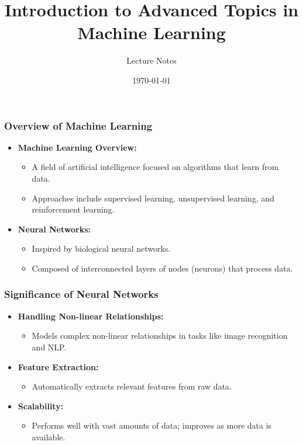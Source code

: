\documentclass[aspectratio=169]{beamer}
\begin{document}
\frame{\titlepage}

\begin{frame}[fragile]
    \title{Introduction to Advanced Topics in Machine Learning}
    \author{Lecture Notes}
    \date{\today}
    \maketitle
\end{frame}

\begin{frame}[fragile]
    \frametitle{Overview of Machine Learning}
    \begin{itemize}
        \item \textbf{Machine Learning Overview:}
        \begin{itemize}
            \item A field of artificial intelligence focused on algorithms that learn from data.
            \item Approaches include supervised learning, unsupervised learning, and reinforcement learning.
        \end{itemize}
        
        \item \textbf{Neural Networks:}
        \begin{itemize}
            \item Inspired by biological neural networks.
            \item Composed of interconnected layers of nodes (neurons) that process data.
        \end{itemize}
    \end{itemize}
\end{frame}

\begin{frame}[fragile]
    \frametitle{Significance of Neural Networks}
    \begin{itemize}
        \item \textbf{Handling Non-linear Relationships:}
        \begin{itemize}
            \item Models complex non-linear relationships in tasks like image recognition and NLP.
        \end{itemize}
        
        \item \textbf{Feature Extraction:}
        \begin{itemize}
            \item Automatically extracts relevant features from raw data.
        \end{itemize}
        
        \item \textbf{Scalability:}
        \begin{itemize}
            \item Performs well with vast amounts of data; improves as more data is available.
        \end{itemize}
    \end{itemize}
\end{frame}
\end{document}
